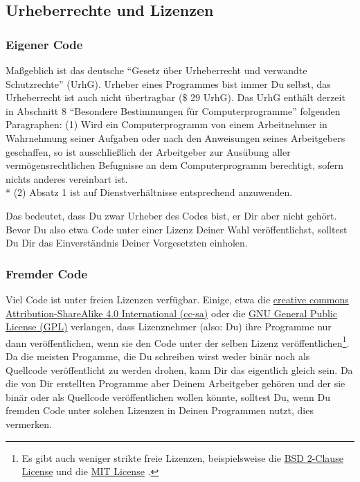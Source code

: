 \documentclass[twoside]{scrartcl}
\begin{document}
\subsection{Urheberrechte und Lizenzen}
\subsubsection{Eigener Code}
Ma\ss{}geblich ist das deutsche "`Gesetz \"u{}ber Urheberrecht und verwandte
Schutzrechte"' (UrhG). 
Urheber eines Programmes bist immer Du selbst, das Urheberrecht ist auch nicht
\"u{}bertragbar (\$ 29 UrhG).
Das UrhG enth\"a{}lt derzeit in Abschnitt 8 "`Besondere Bestimmungen
f\"u{}r 
Computerprogramme"' folgenden Paragraphen:
(1) Wird ein Computerprogramm von einem Arbeitnehmer in Wahrnehmung seiner
Aufgaben oder nach den Anweisungen seines Arbeitgebers geschaffen, so ist
ausschlie\ss{}lich der Arbeitgeber zur Aus\"u{}bung aller 
verm\"o{}gensrechtlichen Befugnisse an dem Computerprogramm berechtigt, sofern 
nichts anderes vereinbart ist.\\*
(2) Absatz 1 ist auf Dienstverh\"a{}ltnisse entsprechend anzuwenden.

Das bedeutet, dass Du zwar Urheber des Codes bist, er Dir aber nicht
geh\"o{}rt. Bevor Du also etwa Code unter einer Lizenz Deiner Wahl
ver\"o{}ffentlichst, solltest Du Dir das Einverst\"a{}ndnis Deiner Vorgesetzten 
einholen.

\subsubsection{Fremder Code\label{sec:copy_foreign}}
Viel Code ist unter freien Lizenzen verf\"u{}gbar. Einige, etwa die
\href{https://creativecommons.org/licenses/by-sa/4.0/legalcode}{creative commons
Attribution-ShareAlike 4.0 International (cc-sa)} oder die
\href{http://www.gnu.org/licenses/gpl-3.0.html}{GNU General Public License
(GPL)} verlangen, dass Lizenznehmer (also: Du) ihre Programme nur dann
ver\"o{}ffentlichen, wenn sie den Code unter der selben Lizenz
ver\"o{}ffentlichen\footnote{Es gibt auch weniger strikte freie Lizenzen,
beispielsweise die 
\href{http://opensource.org/licenses/BSD-2-Clause}{BSD 2-Clause License} und
die 
\href{http://opensource.org/licenses/MIT}{MIT License}%
. }.
Da die meisten Progamme, die Du schreiben wirst weder bin\"a{}r noch als
Quellcode ver\"o{}ffentlicht zu werden drohen, kann Dir das eigentlich gleich 
sein.
Da die von Dir erstellten Programme aber Deinem Arbeitgeber geh\"o{}ren und der
sie bin\"a{}r oder als Quellcode ver\"o{}ffentlichen wollen  k\"o{}nnte, 
solltest Du, wenn Du fremden Code unter solchen Lizenzen in Deinen Programmen
nutzt, dies vermerken.
\end{document}
